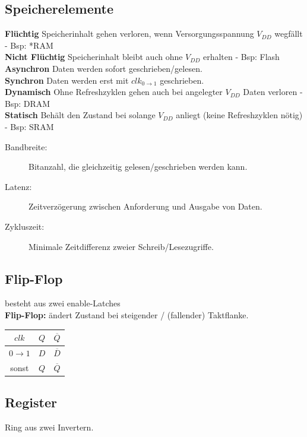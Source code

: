 \documentclass[6pt,a4paper]{scrartcl}
\renewcommand{\emph}[1]{\textsf{\textbf{#1}}}
\newcommand{\ol}[1]{\ensuremath{\overline{#1}}}									%
\newcommand{\ra}[0]{\ensuremath{\rightarrow}} 									%
\begin{document}
\begin{multicols}{3}
\section{Speicherelemente}
	\emph{Flüchtig} Speicherinhalt gehen verloren, wenn Versorgungsspannung $V_{DD}$ wegfällt - Bsp: *RAM\\
	\emph{Nicht Flüchtig} Speicherinhalt bleibt auch ohne $V_{DD}$ erhalten - Bsp: Flash\\
	\emph{Asynchron} Daten werden sofort geschrieben/gelesen.\\
	\emph{Synchron} Daten werden erst mit $clk_{0 \ra 1}$ geschrieben.\\
	\emph{Dynamisch} Ohne Refreshzyklen gehen auch bei angelegter $V_{DD}$ Daten verloren -  Bsp: DRAM\\
	\emph{Statisch} Behält den Zustand bei solange $V_{DD}$ anliegt (keine Refreshzyklen nötig) - Bsp: SRAM\\
	\begin{description}
		\item[Bandbreite:] Bitanzahl, die gleichzeitig gelesen/geschrieben werden kann.
		\item[Latenz:] Zeitverzögerung zwischen Anforderung und Ausgabe von Daten.
		\item[Zykluszeit:] Minimale Zeitdifferenz zweier Schreib/Lesezugriffe.
	\end{description}
	

	\subsection{Flip-Flop}
	\begin{multicols}{2}
	besteht aus zwei enable-Latches \\
	\emph{Flip-Flop:} ändert Zustand bei steigender / (fallender) Taktflanke.\\
	\begin{tabular}{c|c|c} $clk$ & $Q$ & $\ol Q$ \\ \hline $0 \ra 1$ & $D$ & $\ol D$ \\ sonst & $Q$ & $\ol Q$ \end{tabular}
	\end{multicols}
	\subsection{Register}
	Ring aus zwei Invertern.


\end{multicols}
\end{document}
